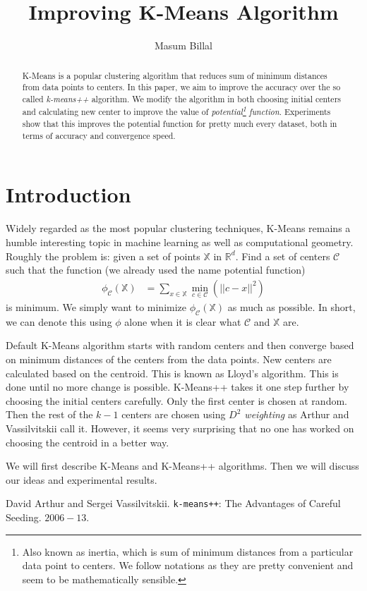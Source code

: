 \documentclass[10pt, leqno]{article}
\author{Masum Billal}
\title{\bfseries Improving K-Means Algorithm}
\begin{document}
	\maketitle
		\begin{abstract}
			K-Means is a popular clustering algorithm that reduces sum of minimum distances from data points to centers. In this paper, we aim to improve the accuracy over the so called \textit{k-means++} algorithm. We modify the algorithm in both choosing initial centers and calculating new center to improve the value of \textit{potential\footnote{Also known as inertia, which is sum of minimum distances from a particular data point to centers. We follow \cite{kmeans++} notations as they are pretty convenient and seem to be mathematically sensible.} function}. Experiments show that this improves the potential function for pretty much every dataset, both in terms of accuracy and convergence speed.
		\end{abstract}
	\section{Introduction}
	Widely regarded as the most popular clustering techniques, K-Means remains a humble interesting topic in machine learning as well as computational geometry. Roughly the problem is: given a set of points $\mathbb{X}$ in $\mathbb{R}^d$. Find a set of centers $\mathcal{C}$ such that the function (we already used the name potential function)
		\begin{align*}
			\phi_{\mathcal{C}}(\mathbb{X}) & = \sum_{x\in\mathbb{X}}\min_{c\in\mathcal{C}}(||c-x||^2)
		\end{align*}
	is minimum. We simply want to minimize $\phi_{\mathcal{C}}(\mathbb{X})$ as much as possible. In short, we can denote this using $\phi$ alone when it is clear what $\mathcal{C}$ and $\mathbb{X}$ are.
	
	Default K-Means algorithm starts with random centers and then converge based on minimum distances of the centers from the data points. New centers are calculated based on the centroid. This is known as Lloyd's algorithm. This is done until no more change is possible. K-Means++ takes it one step further by choosing the initial centers carefully. Only the first center is chosen at random. Then the rest of the $k-1$ centers are chosen using \textit{$D^2$ weighting} as Arthur and Vassilvitskii call it\cite{kmeans++}. However, it seems very surprising that no one has worked on choosing the centroid in a better way.
	
	We will first describe K-Means and K-Means++ algorithms. Then we will discuss our ideas and experimental results.
	\begin{thebibliography}{99}
		 David Arthur and Sergei Vassilvitskii. \texttt{k-means++}: The Advantages of Careful Seeding. $2006-13$.
	\end{thebibliography}
\end{document}
